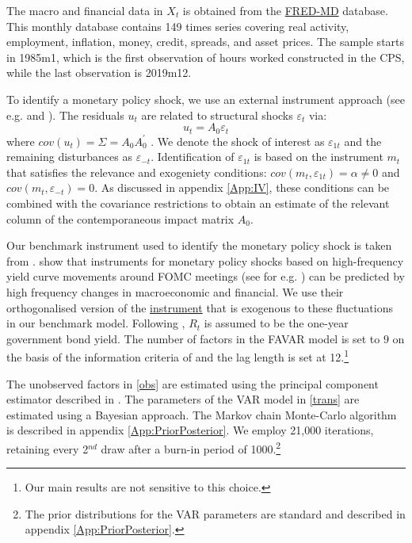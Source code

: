 \documentclass[a4paper,12pt]{article}%
\begin{document}
The macro and financial data in $X_{t}$ is obtained from the \href{https://research.stlouisfed.org/econ/mccracken/fred-databases/}{FRED-MD} database. This monthly database contains 149 times series covering real activity, employment, inflation, money, credit, spreads, and asset prices. The sample starts in 1985m1, which is the first observation of hours worked constructed in the CPS, while the last observation is 2019m12. 


To identify a monetary policy shock, we use an external instrument
approach (see e.g. \cite{SW:2008} and \cite{MR:2013}). The residuals $u_{t}$
 are related to structural shocks $\varepsilon _{t}$ via:%
\begin{equation}
u_{t}=A_{0}\varepsilon _{t}  \label{A0}
\end{equation}%
where $cov\left( u_{t}\right) =\Sigma =A_{0}A_{0}^{\prime }$%
. We denote the shock of interest as $\varepsilon _{1t}$ and the
remaining disturbances as $\varepsilon _{-t}.$ Identification of $%
\varepsilon _{1t}$ is based on the instrument $m_{t}$ that
satisfies the relevance and exogeniety conditions: $cov\left(
m_{t},\varepsilon _{1t}\right) =\alpha \neq 0$ and $cov\left(
m_{t},\varepsilon _{-t}\right) =0$. As discussed in appendix \ref{App:IV},
these conditions can be combined with the covariance restrictions to obtain
an estimate of the relevant column of the contemporaneous impact matrix $%
A_{0}.$


Our benchmark instrument used to identify the monetary policy
shock is taken from \cite{Bauer_Swanson}. \cite{Bauer_Swanson} show that instruments for monetary policy shocks based on high-frequency yield curve movements around FOMC meetings (see for e.g. \cite{GK:2015}) can be predicted by high frequency changes in macroeconomic and financial. We use their orthogonalised version of the \href{https://www.frbsf.org/research-and-insights/data-and-indicators/monetary-policy-surprises/}{instrument} that is exogenous to these fluctuations in our benchmark model. Following 
\cite{GK:2015}, $R_{t}$ is assumed to be the one-year government
bond yield.
The number of factors in the FAVAR model is set to $9$ on the
basis of the information criteria of \cite{BN:2002} and the lag length is set at 12.\footnote{Our main results are not sensitive to this choice.}


The unobserved factors in \eqref{obs} are estimated using the principal component estimator described in \citet{BLL:2020}. The parameters of the VAR model in \eqref{trans} are estimated using a Bayesian approach. The Markov chain Monte-Carlo algorithm is described in appendix \ref{App:PriorPosterior}. We employ 21,000
iterations, retaining every 2$^{nd}$ draw after a burn-in period
of 1000.\footnote{The prior distributions for the VAR parameters are standard and
described in appendix \ref{App:PriorPosterior}.}
\end{document}
